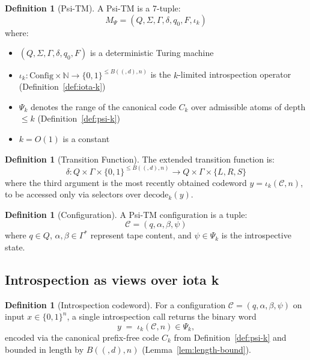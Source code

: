 \documentclass[11pt]{article}
\let\oldlog\log
\renewcommand{\log}{\oldlog_2}
\theoremstyle{plain}
\theoremstyle{definition}
\newtheorem{definition}[theorem]{Definition}
\newcommand{\bits}{\{0,1\}}
\newcommand{\B}[2]{B(#1,#2)}  %
\begin{document}
\begin{definition}[Psi-TM]
A Psi-TM is a 7-tuple:
$$M_\Psi = (Q, \Sigma, \Gamma, \delta, q_0, F, \iota_k)$$
where:
\begin{itemize}
\item $(Q, \Sigma, \Gamma, \delta, q_0, F)$ is a deterministic Turing machine
\item $\iota_k: \mathrm{Config}\times \mathbb{N} \to \{0,1\}^{\le \B(d,n)}$ is the $k$-limited introspection operator (Definition~\ref{def:iota-k})
\item $\Psi_k$ denotes the range of the canonical code $C_k$ over admissible atoms of depth $\le k$ (Definition~\ref{def:psi-k})
\item $k = O(1)$ is a constant
\end{itemize}
\end{definition}

\begin{definition}[Transition Function]
The extended transition function is:
$$\delta: Q \times \Gamma \times \bits^{\le \B(d,n)} \to Q \times \Gamma \times \{L, R, S\}$$
where the third argument is the most recently obtained codeword $y=\iota_k(\mathcal{C},n)$, to be accessed only via selectors over $\mathrm{decode}_k(y)$.
\end{definition}

\begin{definition}[Configuration]
A Psi-TM configuration is a tuple:
$$\mathcal{C} = (q, \alpha, \beta, \psi)$$
where $q \in Q$, $\alpha, \beta \in \Gamma^*$ represent tape content, and $\psi \in \Psi_k$ is the introspective state.
\end{definition}

\subsection{Introspection as views over iota k}

\begin{definition}[Introspection codeword]
For a configuration $\mathcal{C}=(q,\alpha,\beta,\psi)$ on input $x\in\bits^n$, a single introspection call returns the binary word
\[
y \;=\; \iota_k(\mathcal{C},n)\in\Psi_k,
\]
encoded via the canonical prefix-free code $C_k$ from Definition~\ref{def:psi-k} and bounded in length by $\B(d,n)$ (Lemma~\ref{lem:length-bound}).
\end{definition}
\end{document}
